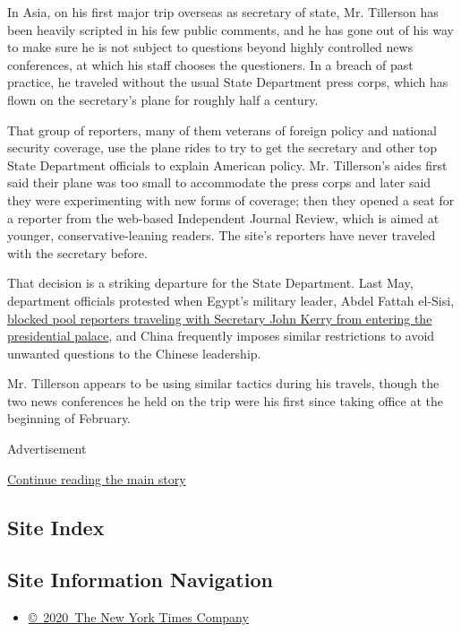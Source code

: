 In Asia, on his first major trip overseas as secretary of state, Mr.
Tillerson has been heavily scripted in his few public comments, and he
has gone out of his way to make sure he is not subject to questions
beyond highly controlled news conferences, at which his staff chooses
the questioners. In a breach of past practice, he traveled without the
usual State Department press corps, which has flown on the secretary's
plane for roughly half a century.

That group of reporters, many of them veterans of foreign policy and
national security coverage, use the plane rides to try to get the
secretary and other top State Department officials to explain American
policy. Mr. Tillerson's aides first said their plane was too small to
accommodate the press corps and later said they were experimenting with
new forms of coverage; then they opened a seat for a reporter from the
web-based Independent Journal Review, which is aimed at younger,
conservative-leaning readers. The site's reporters have never traveled
with the secretary before.

That decision is a striking departure for the State Department. Last
May, department officials protested when Egypt's military leader, Abdel
Fattah el-Sisi,
\href{https://www.nytimes.com/2016/05/19/insider/egypt-john-kerry-abdel-fattah-el-sisi.html}{blocked
pool reporters traveling with Secretary John Kerry from entering the
presidential palace}, and China frequently imposes similar restrictions
to avoid unwanted questions to the Chinese leadership.

Mr. Tillerson appears to be using similar tactics during his travels,
though the two news conferences he held on the trip were his first since
taking office at the beginning of February.

Advertisement

\protect\hyperlink{after-bottom}{Continue reading the main story}

\hypertarget{site-index}{%
\subsection{Site Index}\label{site-index}}

\hypertarget{site-information-navigation}{%
\subsection{Site Information
Navigation}\label{site-information-navigation}}

\begin{itemize}
\tightlist
\item
  \href{https://help.nytimes.com/hc/en-us/articles/115014792127-Copyright-notice}{©~2020~The
  New York Times Company}
\end{itemize}

